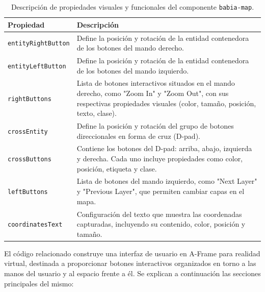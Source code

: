 \documentclass[a4paper, 12pt]{book}
\begin{document}
\begin{table}[H]
\centering
\begin{tabular}{|p{4cm}|p{10cm}|}
\hline
\textbf{Propiedad} & \textbf{Descripción} \\
\hline
\texttt{entityRightButton} & Define la posición y rotación de la entidad contenedora de los botones del mando derecho. \\
\hline
\texttt{entityLeftButton} & Define la posición y rotación de la entidad contenedora de los botones del mando izquierdo. \\
\hline
\texttt{rightButtons} & Lista de botones interactivos situados en el mando derecho, como "Zoom In" y "Zoom Out", con sus respectivas propiedades visuales (color, tamaño, posición, texto, clase). \\
\hline
\texttt{crossEntity} & Define la posición y rotación del grupo de botones direccionales en forma de cruz (D-pad). \\
\hline
\texttt{crossButtons} & Contiene los botones del D-pad: arriba, abajo, izquierda y derecha. Cada uno incluye propiedades como color, posición, etiqueta y clase. \\
\hline
\texttt{leftButtons} & Lista de botones del mando izquierdo, como "Next Layer" y "Previous Layer", que permiten cambiar capas en el mapa. \\
\hline
\texttt{coordinatesText} & Configuración del texto que muestra las coordenadas capturadas, incluyendo su contenido, color, posición y tamaño. \\
\hline
\end{tabular}
\caption{Descripción de propiedades visuales y funcionales del componente \texttt{babia-map}.}
\label{tab:babia-properties}
\end{table}


El código relacionado construye una interfaz de usuario en A-Frame para realidad virtual, destinada a proporcionar botones interactivos organizados en torno a las manos del usuario y al espacio frente a él. Se explican a continuación las secciones principales del mismo:
\end{document}
